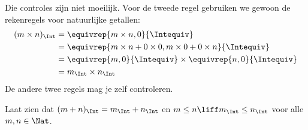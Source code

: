 \documentclass[../../../include/open-logic-section]{subfiles}
\begin{document}
Die controles zijn niet moeilijk. Voor de tweede regel gebruiken we
gewoon de rekenregels voor natuurlijke getallen:
	\begin{align*}
		(m \times n)_\Int  &= \equivrep{m \times n, 0}{\Intequiv} \\
		&= \equivrep{m \times n + 0 \times 0, m \times 0 + 0 \times n}{\Intequiv} \\
		&= \equivrep{m, 0}{\Intequiv} \times \equivrep{n, 0}{\Intequiv} \\
		&= m_\Int \times n_\Int
	\end{align*}
De andere twee regels mag je zelf controleren.
\begin{prob}
	Laat zien dat $(m + n)_\Int = m_\Int + n_\Int$ en $m \leq n \liff
	m_\Int \leq n_\Int$ voor alle $m, n \in \Nat$.
\end{prob}
\end{document}
